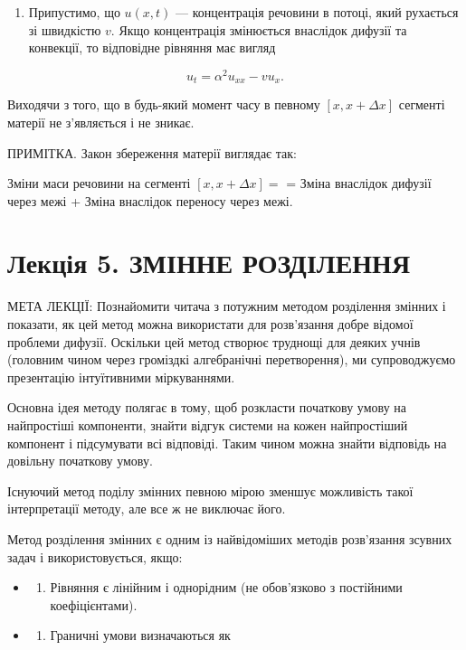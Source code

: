 \documentclass[
  ukrainian,
]{article}
\providecommand{\tightlist}{%
  \setlength{\itemsep}{0pt}\setlength{\parskip}{0pt}}
\begin{document}
\begin{enumerate}
\def\labelenumi{\arabic{enumi}.}
\setcounter{enumi}{3}
\tightlist
\item
  Припустимо, що \(u(x,t)\) --- концентрація речовини в потоці, який
  рухається зі швидкістю \(v\). Якщо концентрація змінюється внаслідок
  дифузії та конвекції, то відповідне рівняння має вигляд
\end{enumerate}

\[
u_t = \alpha^2 u_{xx} - v u_x.
\]

Виходячи з того, що в будь-який момент часу в певному
\([x, x + \Delta x]\) сегменті матерії не з'являється і не зникає.

ПРИМІТКА. Закон збереження матерії виглядає так:

Зміни маси речовини на сегменті \([x, x + \Delta x] =\) = Зміна
внаслідок дифузії через межі + Зміна внаслідок переносу через межі.

\section{Лекція 5. ЗМІННЕ
РОЗДІЛЕННЯ}\label{ux43bux435ux43aux446ux456ux44f-5.-ux437ux43cux456ux43dux43dux435-ux440ux43eux437ux434ux456ux43bux435ux43dux43dux44f}

МЕТА ЛЕКЦІЇ: Познайомити читача з потужним методом розділення змінних і
показати, як цей метод можна використати для розв'язання добре відомої
проблеми дифузії. Оскільки цей метод створює труднощі для деяких учнів
(головним чином через громіздкі алгебранічні перетворення), ми
супроводжуємо презентацію інтуїтивними міркуваннями.

Основна ідея методу полягає в тому, щоб розкласти початкову умову на
найпростіші компоненти, знайти відгук системи на кожен найпростіший
компонент і підсумувати всі відповіді. Таким чином можна знайти
відповідь на довільну початкову умову.

Існуючий метод поділу змінних певною мірою зменшує можливість такої
інтерпретації методу, але все ж не виключає його.

Метод розділення змінних є одним із найвідоміших методів розв'язання
зсувних задач і використовується, якщо:

\begin{itemize}
\tightlist
\item
  \begin{enumerate}
  \def\labelenumi{\arabic{enumi}.}
  \tightlist
  \item
    Рівняння є лінійним і однорідним (не обов'язково з постійними
    коефіцієнтами).
  \end{enumerate}
\item
  \begin{enumerate}
  \def\labelenumi{\arabic{enumi}.}
  \setcounter{enumi}{1}
  \tightlist
  \item
    Граничні умови визначаються як
  \end{enumerate}
\end{itemize}
\end{document}
